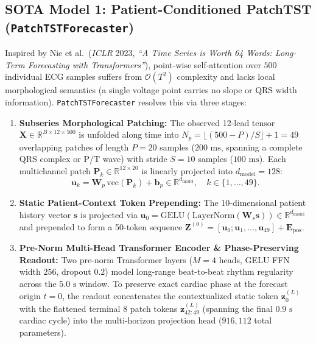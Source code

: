\documentclass[11pt,a4paper]{article}
\begin{document}
\subsection{SOTA Model 1: Patient-Conditioned PatchTST (\texttt{PatchTSTForecaster})}
Inspired by Nie et al.\ (\emph{ICLR} 2023, \emph{``A Time Series is Worth 64 Words: Long-Term Forecasting with Transformers''}), point-wise self-attention over $500$ individual ECG samples suffers from $\mathcal{O}(T^2)$ complexity and lacks local morphological semantics (a single voltage point carries no slope or QRS width information). \texttt{PatchTSTForecaster} resolves this via three stages:
\begin{enumerate}
    \item \textbf{Subseries Morphological Patching:} The observed 12-lead tensor $\mathbf{X} \in \mathbb{R}^{B \times 12 \times 500}$ is unfolded along time into $N_p = \lfloor(500 - P)/S\rfloor + 1 = 49$ overlapping patches of length $P = 20$ samples ($200\text{ ms}$, spanning a complete QRS complex or P/T wave) with stride $S = 10$ samples ($100\text{ ms}$). Each multichannel patch $\mathbf{P}_k \in \mathbb{R}^{12 \times 20}$ is linearly projected into $d_{\text{model}} = 128$:
    \begin{equation}
        \mathbf{u}_k = \mathbf{W}_p \,\text{vec}(\mathbf{P}_k) + \mathbf{b}_p \in \mathbb{R}^{d_{\text{model}}}, \quad k \in \{1,\dots,49\}.
    \end{equation}
    \item \textbf{Static Patient-Context Token Prepending:} The 10-dimensional patient history vector $\mathbf{s}$ is projected via $\mathbf{u}_0 = \text{GELU}(\text{LayerNorm}(\mathbf{W}_s \mathbf{s})) \in \mathbb{R}^{d_{\text{model}}}$ and prepended to form a 50-token sequence $\mathbf{Z}^{(0)} = [\mathbf{u}_0; \mathbf{u}_1, \dots, \mathbf{u}_{49}] + \mathbf{E}_{\text{pos}}$.
    \item \textbf{Pre-Norm Multi-Head Transformer Encoder \& Phase-Preserving Readout:} Two pre-norm Transformer layers ($M = 4$ heads, GELU FFN width $256$, dropout $0.2$) model long-range beat-to-beat rhythm regularity across the $5.0\text{ s}$ window. To preserve exact cardiac phase at the forecast origin $t = 0$, the readout concatenates the contextualized static token $\mathbf{z}_0^{(L)}$ with the flattened terminal $8$ patch tokens $\mathbf{z}_{42:49}^{(L)}$ (spanning the final $0.9\text{ s}$ cardiac cycle) into the multi-horizon projection head ($916{,}112$ total parameters).
\end{enumerate}
\end{document}
